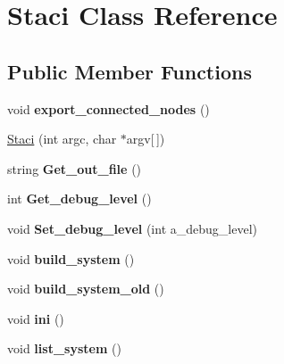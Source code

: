 \hypertarget{class_staci}{}\section{Staci Class Reference}
\label{class_staci}
\subsection*{Public Member Functions}
\begin{DoxyCompactItemize}
\item 
void {\bfseries export\+\_\+connected\+\_\+nodes} ()\hypertarget{class_staci_ac0b3fc6ab6ed135b47b004e0053b51a1}{}\label{class_staci_ac0b3fc6ab6ed135b47b004e0053b51a1}

\item 
\hyperlink{class_staci_a6f7ee7b08cba6b9a84a2472610fc9b30}{Staci} (int argc, char $\ast$argv\mbox{[}$\,$\mbox{]})
\item 
string {\bfseries Get\+\_\+out\+\_\+file} ()\hypertarget{class_staci_a3b63425864b8bbc369a64e61803fe5fe}{}\label{class_staci_a3b63425864b8bbc369a64e61803fe5fe}

\item 
int {\bfseries Get\+\_\+debug\+\_\+level} ()\hypertarget{class_staci_a60eb2cc5e192ece5607684d13252ea42}{}\label{class_staci_a60eb2cc5e192ece5607684d13252ea42}

\item 
void {\bfseries Set\+\_\+debug\+\_\+level} (int a\+\_\+debug\+\_\+level)\hypertarget{class_staci_aae5279dcb5e5ac4543aa1bcf0b104da1}{}\label{class_staci_aae5279dcb5e5ac4543aa1bcf0b104da1}

\item 
void {\bfseries build\+\_\+system} ()\hypertarget{class_staci_a0153c20898e554922b15cee551a9f982}{}\label{class_staci_a0153c20898e554922b15cee551a9f982}

\item 
void {\bfseries build\+\_\+system\+\_\+old} ()\hypertarget{class_staci_ac8690e5b15e90589d09bf72b07d24e5e}{}\label{class_staci_ac8690e5b15e90589d09bf72b07d24e5e}

\item 
void {\bfseries ini} ()\hypertarget{class_staci_ad884bf7a487813b79d2a171cbfd0537a}{}\label{class_staci_ad884bf7a487813b79d2a171cbfd0537a}

\item 
void {\bfseries list\+\_\+system} ()\hypertarget{class_staci_ae95917401c8454a747a24880faa20138}{}\label{class_staci_ae95917401c8454a747a24880faa20138}


\end{DoxyCompactItemize}
